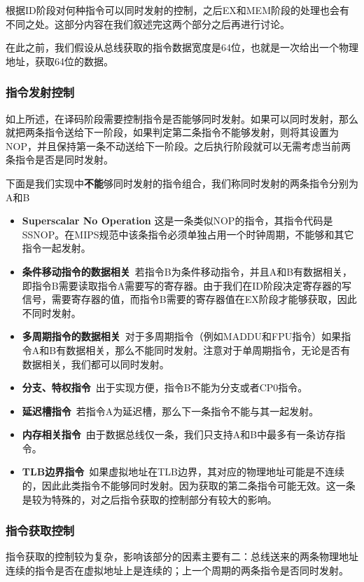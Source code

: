 根据ID阶段对何种指令可以同时发射的控制，之后EX和MEM阶段的处理也会有不同之处。这部分内容在我们叙述完这两个部分之后再进行讨论。

在此之前，我们假设从总线获取的指令数据宽度是64位，也就是一次给出一个物理地址，获取64位的数据。

\subsubsection{指令发射控制}
如上所述，在译码阶段需要控制指令是否能够同时发射。如果可以同时发射，那么就把两条指令送给下一阶段，如果判定第二条指令不能够发射，则将其设置为NOP，并且保持第一条不动送给下一阶段。之后执行阶段就可以无需考虑当前两条指令是否是同时发射。

下面是我们实现中\textbf{不能}够同时发射的指令组合，我们称同时发射的两条指令分别为A和B

\begin{itemize}
\item \textbf{Superscalar No Operation} 这是一条类似NOP的指令，其指令代码是SSNOP。在MIPS规范中该条指令必须单独占用一个时钟周期，不能够和其它指令一起发射。

\item \textbf{条件移动指令的数据相关}\ 若指令B为条件移动指令，并且A和B有数据相关，即指令B需要读取指令A需要写的寄存器。由于我们在ID阶段决定寄存器的写信号，需要寄存器的值，而指令B需要的寄存器值在EX阶段才能够获取，因此不同时发射。

\item \textbf{多周期指令的数据相关}\ 对于多周期指令（例如MADDU和FPU指令）如果指令A和B有数据相关，那么不能同时发射。注意对于单周期指令，无论是否有数据相关，我们都可以同时发射。

\item \textbf{分支、特权指令}\ 出于实现方便，指令B不能为分支或者CP0指令。

\item \textbf{延迟槽指令}\ 若指令A为延迟槽，那么下一条指令不能与其一起发射。

\item \textbf{内存相关指令}\ 由于数据总线仅一条，我们只支持A和B中最多有一条访存指令。

\item \textbf{TLB边界指令}\ 如果虚拟地址在TLB边界，其对应的物理地址可能是不连续的，因此此类指令不能够同时发射。因为获取的第二条指令可能无效。这一条是较为特殊的，对之后指令获取的控制部分有较大的影响。
\end{itemize}

\subsubsection{指令获取控制}
指令获取的控制较为复杂，影响该部分的因素主要有二：总线送来的两条物理地址连续的指令是否在虚拟地址上是连续的；上一个周期的两条指令是否同时发射。

